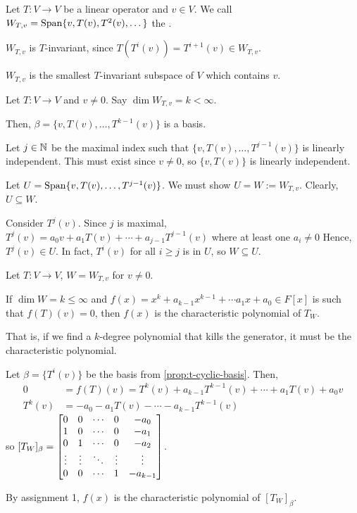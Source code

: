 \documentclass[notes,tikz]{agony}
\begin{document}
\begin{defn}
  Let $T : V \to V$ be a linear operator and $v \in V$.
  We call $W_{T,v} = \operatorname{Span}\{v,T(v),T^2(v),\dotsc\}$
  the .
\end{defn}

\begin{remark}
  $W_{T,v}$ is $T$-invariant, since $T(T^i(v)) = T^{i+1}(v) \in W_{T,v}$.

  $W_{T,v}$ is the smallest $T$-invariant subspace of $V$ which contains $v$.
\end{remark}

\begin{prop}\label{prop:t-cyclic-basis}
  Let $T : V \to V$ and $v \neq 0$.
  Say $\dim W_{T,v} = k < \infty$.

  Then, $\beta = \{v,T(v),\dotsc,T^{k-1}(v)\}$ is a basis.
\end{prop}
\begin{prf}
  Let $j \in \mathbb{N}$ be the maximal index such that $\{v,T(v),\dotsc,T^{j-1}(v)\}$
  is linearly independent.
  This must exist since $v \neq 0$, so $\{v,T(v)\}$ is linearly independent.

  Let $U = \operatorname{Span}\{v,T(v),\dotsc,T^{j-1}(v)\}$.
  We must show $U = W := W_{T,v}$.
  Clearly, $U \subseteq W$.

  Consider $T^j(v)$.
  Since $j$ is maximal, $T^j(v) = a_0v + a_1T(v) + \dotsb + a_{j-1}T^{j-1}(v)$
  where at least one $a_i \neq 0$
  Hence, $T^j(v) \in U$.
  In fact, $T^i(v)$ for all $i \geq j$ is in $U$,
  so $W \subseteq U$.
\end{prf}

\begin{prop}\label{prop:cpoly}
  Let $T : V \to V$, $W = W_{T,v}$ for $v \neq 0$.

  If $\dim W = k \leq \infty$ and $f(x) = x^k + a_{k-1}x^{k-1} + \dotsb a_1x + a_0 \in F[x]$
  is such that $f(T)(v) = 0$,
  then $f(x)$ is the characteristic polynomial of $T_W$.

  That is, if we find a $k$-degree polynomial that kills the generator,
  it must be the characteristic polynomial.
\end{prop}
\begin{prf}
  Let $\beta = \{T^i(v)\}$ be the basis from \cref{prop:t-cyclic-basis}.
  Then,
  \begin{align*}
    0      & = f(T)(v) = T^k(v) + a_{k-1}T^{k-1}(v) + \dotsb + a_1 T(v) + a_0 v \\
    T^k(v) & = -a_0 - a_1T(v) - \dotsb - a_{k-1}T^{k-1}(v)
  \end{align*}
  so $[T_W]_\beta = \mqty[0&0&\cdots&0&-a_0\\1&0&\cdots&0&-a_1\\0&1&\cdots&0&-a_2\\\vdots&\vdots&\ddots&\vdots&\vdots\\0&0&\cdots&1&-a_{k-1}]$.

  By assignment 1, $f(x)$ is the characteristic polynomial of $[T_W]_\beta$.
\end{prf}
\end{document}
